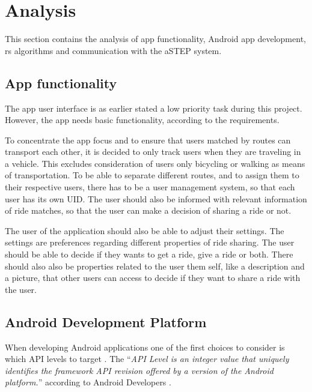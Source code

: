 \section{Analysis}
This section contains the analysis of app functionality, Android app development, \gls{rs} algorithms and communication with the aSTEP system.

\subsection{App functionality}
The app user interface is as earlier stated a low priority task during this project.
However, the app needs basic functionality, according to the requirements.

To concentrate the app focus and to ensure that users matched by routes can transport each other, it is decided to only track users when they are traveling in a vehicle.
This excludes consideration of users only bicycling or walking as means of transportation.
To be able to separate different routes, and to assign them to their respective users, there has to be a user management system, so that each user has its own UID.
The user should also be informed with relevant information of ride matches, so that the user can make a decision of sharing a ride or not.

The user of the application should also be able to adjust their settings.
The settings are preferences regarding different properties of ride sharing.
The user should be able to decide if they wants to get a ride, give a ride or both.
There should also also be properties related to the user them self, like a description and a picture, that other users can access to decide if they want to share a ride with the user.


\subsection{Android Development Platform}
When developing Android applications one of the first choices to consider is which API levels to target \cite{usesSDK}.
The ``\textit{API Level is an integer value that uniquely identifies the framework API revision offered by a version of the Android platform.}'' according to Android Developers \cite{usesSDK}.

